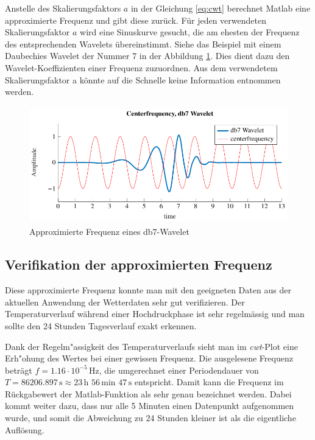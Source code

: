 \begin{refsection}
Anstelle des Skalierungsfaktors $a$ in der Gleichung \ref{eq:cwt} berechnet Matlab eine approximierte Frequenz und gibt diese zurück.
Für jeden verwendeten Skalierungsfaktor $a$ wird eine Sinuskurve gesucht, die am ehesten der Frequenz des entsprechenden Wavelets übereinstimmt.
Siehe das Beispiel mit einem Daubechies Wavelet der Nummer 7 in der Abbildung \ref{fig:centerf}.
Dies dient dazu den Wavelet-Koeffizienten einer Frequenz zuzuordnen. 
Aus dem verwendetem Skalierungsfaktor a könnte auf die Schnelle keine Information entnommen werden.
\begin{figure}
	\centering
	\includegraphics[width=1\textwidth, height=2in]{papers/wwt/images/centerf.pdf}
	\caption{Approximierte Frequenz eines db7-Wavelet}
	\label{fig:centerf}
\end{figure}


\newpage
\subsection{Verifikation der approximierten Frequenz}
\label{Freq}
Diese approximierte Frequenz konnte man mit den geeigneten Daten aus der aktuellen Anwendung der Wetterdaten sehr gut verifizieren.
Der Temperaturverlauf während einer Hochdruckphase ist sehr regelmässig und man sollte den 24 Stunden Tagesverlauf exakt erkennen.

Dank der Regelm"assigkeit des Temperaturverlaufs sieht man im \textit{cwt}-Plot eine Erh"ohung des Wertes bei einer gewissen Frequenz.
Die ausgelesene Frequenz beträgt $f = 1.16\cdot10^{-5} \,\text{Hz}$, die umgerechnet einer Periodendauer von $T = 86206.897\,\text{s}\approx 23\,\text{h }56\,\text{min } 47\,\text{s}$ entspricht.
Damit kann die Frequenz im Rückgabewert der Matlab-Funktion als sehr genau bezeichnet werden.
Dabei kommt weiter dazu, dass nur alle 5 Minuten einen Datenpunkt aufgenommen wurde, und somit die Abweichung zu 24 Stunden kleiner ist als die eigentliche Auflösung.


\end{refsection}
